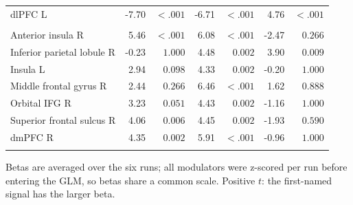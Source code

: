 \begin{table}[htbp]
\begin{threeparttable}
\begin{tabularx}{\textwidth}{X rr rr rr}
        dlPFC L & -7.70 & $<.001$ & -6.71 & $<.001$ & 4.76 & $<.001$ \\
        \addlinespace
        \multicolumn{7}{l}{\textit{uRPE regions}} \\
        Anterior insula R & 5.46 & $<.001$ & 6.08 & $<.001$ & -2.47 & $0.266$ \\
        Inferior parietal lobule R & -0.23 & $1.000$ & 4.48 & $0.002$ & 3.90 & $0.009$ \\
        Insula L & 2.94 & $0.098$ & 4.33 & $0.002$ & -0.20 & $1.000$ \\
        Middle frontal gyrus R & 2.44 & $0.266$ & 6.46 & $<.001$ & 1.62 & $0.888$ \\
        Orbital IFG R & 3.23 & $0.051$ & 4.43 & $0.002$ & -1.16 & $1.000$ \\
        Superior frontal sulcus R & 4.06 & $0.006$ & 4.45 & $0.002$ & -1.93 & $0.590$ \\
        dmPFC R & 4.35 & $0.002$ & 5.91 & $<.001$ & -0.96 & $1.000$ \\
        \addlinespace
        \bottomrule
    \end{tabularx}
    \begin{tablenotes}\footnotesize
    \item Betas are averaged over the six runs; all modulators were
    z-scored per run before entering the GLM, so betas share a common
    scale. Positive $t$: the first-named signal has the larger beta.
    \end{tablenotes}
    \end{threeparttable}
\end{table}%
